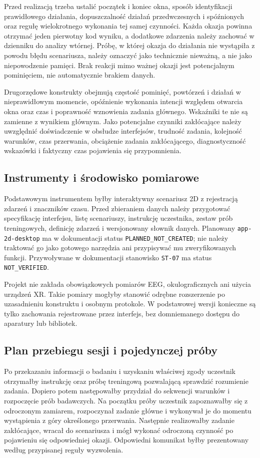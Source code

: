 \documentclass[11pt,a4paper]{article}
\begin{document}
Przed realizacją trzeba ustalić początek i koniec okna, sposób identyfikacji prawidłowego działania, dopuszczalność działań przedwczesnych i spóźnionych oraz regułę wielokrotnego wykonania tej samej czynności. Każda okazja powinna otrzymać jeden pierwotny kod wyniku, a dodatkowe zdarzenia należy zachować w dzienniku do analizy wtórnej. Próbę, w której okazja do działania nie wystąpiła z powodu błędu scenariusza, należy oznaczyć jako technicznie nieważną, a nie jako niepowodzenie pamięci. Brak reakcji mimo ważnej okazji jest potencjalnym pominięciem, nie automatycznie brakiem danych.

Drugorzędowe konstrukty obejmują częstość pominięć, powtórzeń i działań w nieprawidłowym momencie, opóźnienie wykonania intencji względem otwarcia okna oraz czas i poprawność wznowienia zadania głównego. Wskaźniki te nie są zamienne z wynikiem głównym. Jako potencjalne czynniki zakłócające należy uwzględnić doświadczenie w obsłudze interfejsów, trudność zadania, kolejność warunków, czas przerwania, obciążenie zadania zakłócającego, diagnostyczność wskazówki i faktyczny czas pojawienia się przypomnienia.

\subsection{Instrumenty i środowisko pomiarowe}
Podstawowym instrumentem byłby interaktywny scenariusz 2D z rejestracją zdarzeń i znaczników czasu. Przed zbieraniem danych należy przygotować specyfikację interfejsu, listę scenariuszy, instrukcję uczestnika, zestaw prób treningowych, definicję zdarzeń i wersjonowany słownik danych. Planowany \texttt{app-2d-desktop} ma w dokumentacji status \texttt{PLANNED\_NOT\_CREATED}; nie należy traktować go jako gotowego narzędzia ani przypisywać mu zweryfikowanych funkcji. Przywoływane w dokumentacji stanowisko \texttt{ST-07} ma status \texttt{NOT\_VERIFIED}.

Projekt nie zakłada obowiązkowych pomiarów EEG, okulograficznych ani użycia urządzeń XR. Takie pomiary mogłyby stanowić odrębne rozszerzenie po uzasadnieniu konstruktu i osobnym protokole. W podstawowej wersji konieczne są tylko zachowania rejestrowane przez interfejs, bez domniemanego dostępu do aparatury lub bibliotek.

\subsection{Plan przebiegu sesji i pojedynczej próby}
Po przekazaniu informacji o badaniu i uzyskaniu właściwej zgody uczestnik otrzymałby instrukcję oraz próbę treningową pozwalającą sprawdzić rozumienie zadania. Dopiero potem następowałby przydział do sekwencji warunków i rozpoczęcie prób badawczych. Na początku próby uczestnik zapoznawałby się z odroczonym zamiarem, rozpoczynał zadanie główne i wykonywał je do momentu wystąpienia z góry określonego przerwania. Następnie realizowałby zadanie zakłócające, wracał do scenariusza i mógł wykonać odroczoną czynność po pojawieniu się odpowiedniej okazji. Odpowiedni komunikat byłby prezentowany według przypisanej reguły wyzwolenia.
\end{document}
